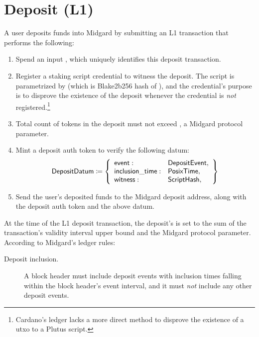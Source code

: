 \documentclass[../midgard.tex]{subfiles}
\begin{document}
\section{Deposit (L1)}
\label{h:deposit}

A user deposits funds into Midgard by submitting an L1 transaction that performs the following:
\begin{enumerate}
    \item Spend an input , which uniquely identifies this deposit transaction.
    \item Register a staking script credential to witness the deposit.
      The script is parametrized by  (which is Blake2b256 hash of ), and the credential's purpose is to disprove the existence of the deposit whenever the credential is \emph{not} registered.\footnote{Cardano's ledger lacks a more direct method to disprove the existence of a utxo to a Plutus script.}
    \item Total count of tokens in the deposit must not exceed , a Midgard protocol parameter.
    \item Mint a deposit auth token to verify the following datum:
        \begin{equation*}
        \mathsf{DepositDatum} \coloneq \left\{
            \begin{array}{ll}
                \mathsf{event} : & \mathsf{DepositEvent}, \\
                \mathsf{inclusion\_time} : & \mathsf{PosixTime}, \\
                \mathsf{witness} : & \mathsf{ScriptHash}, \\
            \end{array}
            \right\}
        \end{equation*}
    \item Send the user's deposited funds to the Midgard deposit address, along with the deposit auth token and the above datum.
\end{enumerate}

At the time of the L1 deposit transaction, the deposit's  is set to the sum of the transaction's validity interval upper bound and the  Midgard protocol parameter.
According to Midgard's ledger rules:
\begin{description}
    \item[Deposit inclusion.] A block header must include deposit events with inclusion times falling within the block header's event interval, and it must \emph{not} include any other deposit events.
\end{description}
\end{document}
